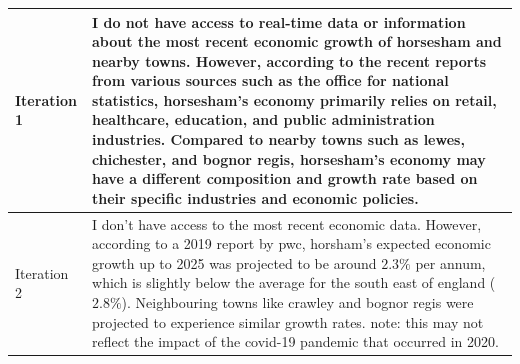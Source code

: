 \documentclass{article}
\begin{document}
\begin{table}[h!]
\begin{tabularx}{\textwidth}{l|X}
Iteration 1 & I do not have access to real-time data or information about the most recent economic growth of horsesham and nearby towns. However, according to the recent reports from various sources such as the office for national statistics, horsesham's economy primarily relies on retail, healthcare, education, and public administration industries. Compared to nearby towns such as lewes, chichester, and bognor regis, horsesham's economy may have a different composition and growth rate based on their specific industries and economic policies.\\
\midrule
Iteration 2 & I don't have access to the most recent economic data. However, according to a 2019 report by pwc, horsham’s expected economic growth up to 2025 was projected to be around $2.3\%$ per annum, which is slightly below the average for the south east of england ($2.8\%$). Neighbouring towns like crawley and bognor regis were projected to experience similar growth rates. note: this may not reflect the impact of the covid-19 pandemic that occurred in 2020.\\
\bottomrule
\end{tabularx}
\label{tab:app_exp1}
\end{table}
\end{document}
